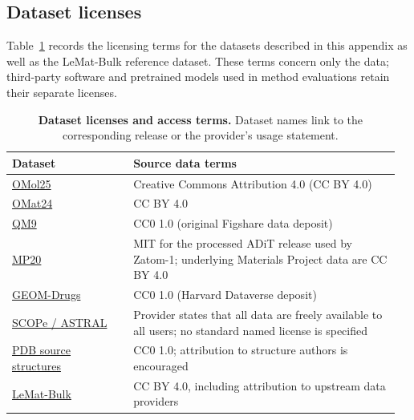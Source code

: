 \documentclass{article} %
\begin{document}
\subsection{Dataset licenses}
\label{app:dataset-licenses}

Table~\ref{tab:zatom2-dataset-licenses} records the licensing terms for the datasets described in this appendix as well as the LeMat-Bulk reference dataset. These terms concern only the data; third-party software and pretrained models used in method evaluations retain their separate licenses.

\begin{table}[htbp]
  \centering
  \small
  \caption{\textbf{Dataset licenses and access terms.} Dataset names link to
  the corresponding release or the provider's usage statement.}
  \label{tab:zatom2-dataset-licenses}
  \vspace{0.4em}
  \begin{tabular}{@{}p{0.30\linewidth}p{0.66\linewidth}@{}}
    \toprule
    Dataset & Source data terms \\
    \midrule
    \href{https://huggingface.co/facebook/OMol25}{OMol25}
      & Creative Commons Attribution 4.0 (CC BY 4.0) \\
    \href{https://huggingface.co/datasets/facebook/OMAT24}{OMat24}
      & CC BY 4.0 \\
    \href{https://doi.org/10.6084/m9.figshare.1057646}{QM9}
      & CC0 1.0 (original Figshare data deposit) \\
    \href{https://huggingface.co/datasets/chaitjo/MP20_ADiT}{MP20}
      & MIT for the processed ADiT release used by Zatom-1;
        underlying Materials Project data are CC BY 4.0 \\
    \href{https://doi.org/10.7910/DVN/JNGTDF}{GEOM-Drugs}
      & CC0 1.0 (Harvard Dataverse deposit) \\
    \href{https://scop.berkeley.edu/about/ver=2.08}{SCOPe / ASTRAL}
      & Provider states that all data are freely available to all users;
        no standard named license is specified \\
    \href{https://www.wwpdb.org/about/usage-policies}{PDB source structures}
      & CC0 1.0; attribution to structure authors is encouraged \\
    \href{https://huggingface.co/datasets/LeMaterial/LeMat-Bulk}{LeMat-Bulk}
      & CC BY 4.0, including attribution to upstream data providers \\
    \bottomrule
  \end{tabular}
\end{table}
\end{document}

